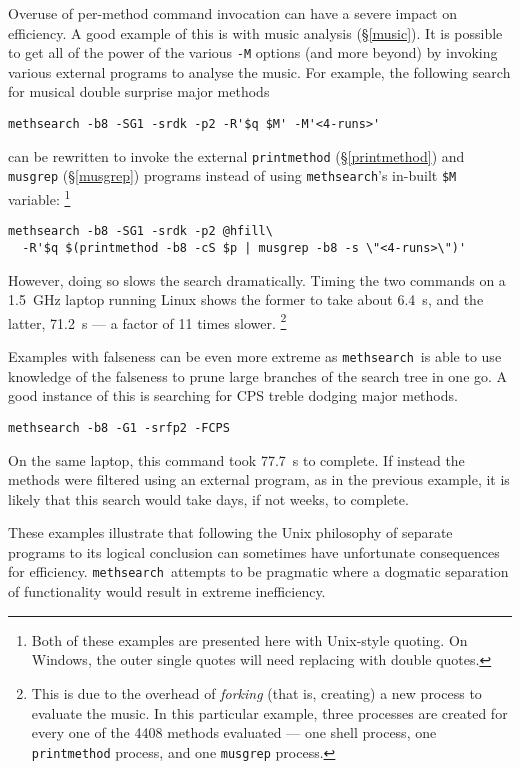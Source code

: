 \documentclass[a4paper,11pt,oneside]{book}
\makeatletter
\newcommand{\ttcmdidx}[1]{\texttt{#1}\index{#1@{\texttt{#1}}}}
\def\methsearch{\texttt{meth\-search}}
\newcommand{\sref}[1]{\hyperref[#1]{\S\ref{#1}}}
\makeatother
\begin{document}
Overuse of per-method command invocation can have a severe impact on 
efficiency.  A good example of this is with music analysis (\sref{music}).
It is possible to get all of the power of the various \verb+-M+ options (and
more beyond) by invoking various external programs to analyse the music.
For example, the following search for musical double surprise major methods%
\begin{Verbatim}
methsearch -b8 -SG1 -srdk -p2 -R'$q $M' -M'<4-runs>'
\end{Verbatim}
can be rewritten to invoke the external \ttcmdidx{printmethod}
(\sref{printmethod}) and \ttcmdidx{musgrep} (\sref{musgrep}) programs 
instead of using \methsearch's in-built \verb+$M+ variable:%
\footnote{Both of these examples are presented here
with Unix-style quoting.  
On Windows, the outer single quotes will need replacing with double quotes.}
\begin{Verbatim}[commandchars=@~~]
methsearch -b8 -SG1 -srdk -p2 @hfill\
  -R'$q $(printmethod -b8 -cS $p | musgrep -b8 -s \"<4-runs>\")'
\end{Verbatim}
However, doing so slows the search dramatically.
Timing the two commands on a 1.5\ GHz laptop running Linux shows the former
to take about 6.4\ s, and the latter, 71.2\ s --- a factor of 11 times slower.%
\footnote{This is due to the overhead of \textit{forking}%
 (that is, creating) a new process to evaluate 
the music.  
In this particular example, three processes are created for every one of 
the 4408 methods evaluated --- one shell\index{shell} process, 
one \texttt{printmethod} process, and one \texttt{musgrep} process.}

Examples with falseness can be even more extreme as \methsearch\ is able to
use knowledge of the falseness to prune large branches of the search tree
in one go.  A good instance of this is searching for 
CPS treble dodging major methods.
\begin{Verbatim}
methsearch -b8 -G1 -srfp2 -FCPS
\end{Verbatim}
On the same laptop, this command took 77.7\ s to complete.  If instead the
methods were filtered using an external program, as in the previous example,
it is likely that this search would take days, if not weeks, to complete.

These examples illustrate that following the Unix philosophy%
 of separate programs to its logical conclusion 
can sometimes have unfortunate consequences for efficiency.  \methsearch\ 
attempts to be pragmatic where a dogmatic separation of functionality would
result in extreme inefficiency.
\end{document}
